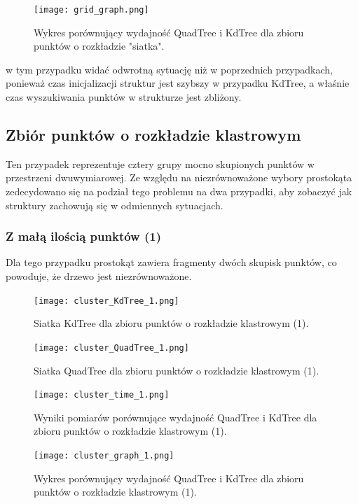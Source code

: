 \documentclass{lab}
\begin{document}
\begin{figure}[H]
  \centering
  \texttt{[image: grid\_graph.png]}
  \caption{Wykres porównujący wydajność QuadTree i KdTree dla zbioru punktów o rozkładzie "siatka".}
  \label{fig:grid_graph}
\end{figure}

w tym przypadku widać odwrotną sytuację niż w poprzednich przypadkach, ponieważ czas inicjalizacji struktur jest szybszy w przypadku KdTree, a właśnie czas wyszukiwania punktów w strukturze jest zbliżony.

\subsection{Zbiór punktów o rozkładzie klastrowym}
Ten przypadek reprezentuje cztery grupy mocno skupionych punktów w przestrzeni dwuwymiarowej.
Ze względu na niezrównoważone wybory prostokąta zedecydowano się na podział tego problemu na dwa przypadki, aby zobaczyć jak struktury zachowują się w odmiennych sytuacjach.

\subsubsection{Z małą ilością punktów (1)}
Dla tego przypadku prostokąt zawiera fragmenty dwóch skupisk punktów, co powoduje, że drzewo jest niezrównoważone.
\begin{figure}[H]
  \centering
  \texttt{[image: cluster\_KdTree\_1.png]}
  \caption{Siatka KdTree dla zbioru punktów o rozkładzie klastrowym (1).}
  \label{fig:cluster_KdTree_1}
\end{figure}

\begin{figure}[H]
  \centering
  \texttt{[image: cluster\_QuadTree\_1.png]}
  \caption{Siatka QuadTree dla zbioru punktów o rozkładzie klastrowym (1).}
  \label{fig:cluster_QuadTree_1}
\end{figure}

\begin{figure}[H]
  \centering
  \texttt{[image: cluster\_time\_1.png]}
  \caption{Wyniki pomiarów porównujące wydajność QuadTree i KdTree dla zbioru punktów o rozkładzie klastrowym (1).}
  \label{fig:cluster_time_1}
\end{figure}

\begin{figure}[H]
  \centering
  \texttt{[image: cluster\_graph\_1.png]}
  \caption{Wykres porównujący wydajność QuadTree i KdTree dla zbioru punktów o rozkładzie klastrowym (1).}
  \label{fig:cluster_graph_1}
\end{figure}
\end{document}
